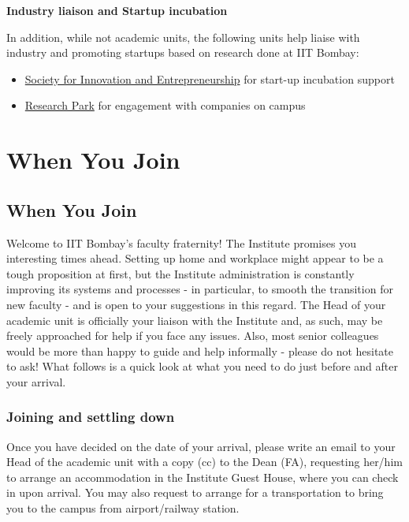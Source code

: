 \documentclass[
  10pt,
  a5paper,
  10pt,
  openany]{amsbook}
\providecommand{\tightlist}{%
  \setlength{\itemsep}{0pt}\setlength{\parskip}{0pt}}
\begin{document}
\textbf{Industry liaison and Startup incubation}

In addition, while not academic units, the following units help liaise
with industry and promoting startups based on research done at IIT
Bombay:

\begin{itemize}
\tightlist
\item
  \href{https://sineiitb.org/}{Society for Innovation and
  Entrepreneurship} for start-up incubation support
\item
  \href{https://iitbresearchpark.com/}{Research Park} for engagement
  with companies on campus
\end{itemize}

\part{When You Join}

\chapter{When You Join}\label{when-you-join-1}

Welcome to IIT Bombay's faculty fraternity! The Institute promises you
interesting times ahead. Setting up home and workplace might appear to
be a tough proposition at first, but the Institute administration is
constantly improving its systems and processes - in particular, to
smooth the transition for new faculty - and is open to your suggestions
in this regard. The Head of your academic unit is officially your
liaison with the Institute and, as such, may be freely approached for
help if you face any issues. Also, most senior colleagues would be more
than happy to guide and help informally - please do not hesitate to ask!
What follows is a quick look at what you need to do just before and
after your arrival.

\section{Joining and settling down}\label{joining-and-settling-down}

Once you have decided on the date of your arrival, please write an email
to your Head of the academic unit with a copy (cc) to the Dean (FA),
requesting her/him to arrange an accommodation in the Institute Guest
House, where you can check in upon arrival. You may also request to
arrange for a transportation to bring you to the campus from
airport/railway station.
\end{document}
